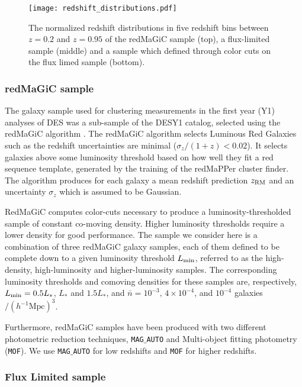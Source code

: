 \documentclass[a4paper,fleqn,usenatbib]{mnras}
\begin{document}
\begin{figure}
\centering
\texttt{[image: redshift\_distributions.pdf]} 
\caption{The normalized redshift distributions in five redshift bins between $z=0.2$ and $z=0.95$ of  the redMaGiC sample (top), a flux-limited sample (middle) and a sample which defined through color cuts  on the flux limed sample (bottom).}
\label{fig: Red_dist_data}
\end{figure}

\subsubsection{redMaGiC sample}
\label{subsubsec: redmag}

The galaxy sample used for clustering measurements in the first year (Y1) analyses of DES was a sub-sample of the DESY1 catalog, selected using  the redMaGiC algorithm \citep{Rozo2016}. The redMaGiC algorithm selects Luminous Red Galaxies such as the redshift uncertainties are minimal ($\sigma_z/(1+z) <0.02$).  It selects galaxies above some luminosity threshold based on how well they fit a red sequence template, generated by the training of the redMaPPer cluster finder. The algorithm  produces for each galaxy a mean redshift prediction $z_{\mbox{\scriptsize{RM}}}$  and an uncertainty $\sigma_z$ which is assumed to be Gaussian.

RedMaGiC computes color-cuts necessary to produce a luminosity-thresholded sample of constant co-moving density. Higher luminosity thresholds require a lower density for good performance. The sample we consider here is a combination of three redMaGiC galaxy samples, each of them defined to be complete down to a given luminosity threshold $L_{\mbox{\scriptsize{min}}}$, referred to as the high-density, high-luminosity and higher-luminosity samples. The corresponding luminosity thresholds and comoving densities for these samples are, respectively, $L_{\mbox{\scriptsize{min}}} =0.5L_*$, $L_*$ and $1.5L_*$, and $\bar{n} =10^{-3}, \,4 \times 10^{-4}$, and $10^{-4}$ galaxies$/(h^{-1} \mbox{Mpc})^3$. 

Furthermore, redMaGiC samples have been produced with two different photometric reduction techniques, \texttt{MAG{$\_$}AUTO} and Multi-object fitting photometry (\texttt{MOF}). We use \texttt{MAG{$\_$}AUTO}  for low redshifts and \texttt{MOF} for higher redshifts. 


\subsubsection{Flux Limited sample}
\label{subsubsec: Flux_lim}
\end{document}
